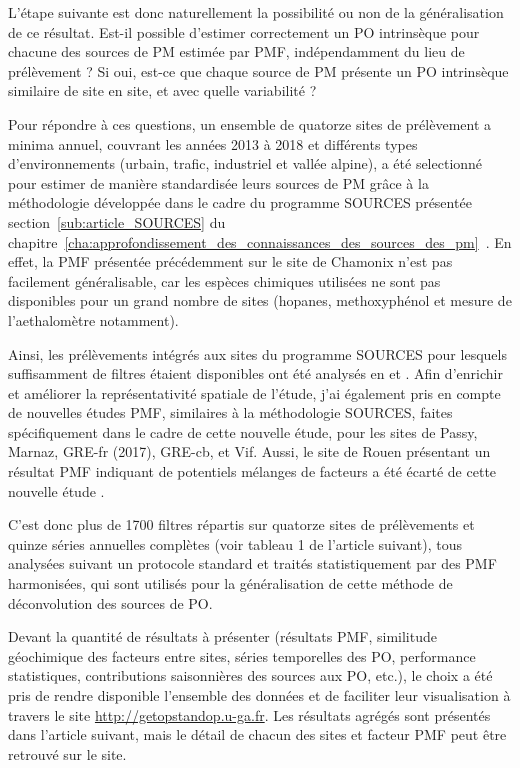 L'étape suivante est donc naturellement la possibilité ou non de la généralisation de ce
résultat.  Est-il possible d'estimer correctement un PO intrinsèque pour chacune des
sources de PM estimée par PMF, indépendamment du lieu de prélèvement ? Si oui, est-ce que
chaque source de PM présente un PO intrinsèque similaire de site en site, et avec quelle
variabilité ?

Pour répondre à ces questions, un ensemble de quatorze sites de prélèvement a minima annuel,
couvrant les années 2013 à 2018 et différents types d'environnements (urbain, trafic,
industriel et vallée alpine),
a été selectionné pour estimer de manière standardisée leurs sources de PM grâce à la
méthodologie développée dans le cadre du programme SOURCES présentée
section~\ref{sub:article_SOURCES} du
chapitre~\ref{cha:approfondissement_des_connaissances_des_sources_des_pm}~\autocite{weberSources2019}.
En effet, la PMF présentée précédemment sur le site de
Chamonix n'est pas facilement généralisable, car les espèces chimiques utilisées ne sont
pas disponibles pour un grand nombre de sites (hopanes, methoxyphénol et mesure de
l'aethalomètre notamment).

Ainsi, les prélèvements intégrés aux sites du programme SOURCES pour lesquels suffisamment de filtres étaient
disponibles ont été analysés en \POAA{} et \PODTT. Afin d'enrichir et améliorer la
représentativité spatiale de l'étude, j'ai également pris en compte de nouvelles études
PMF, similaires à la méthodologie SOURCES, faites spécifiquement dans le cadre de cette
nouvelle étude, pour les sites de Passy, Marnaz, GRE-fr (2017), GRE-cb, et Vif.
Aussi, le site de Rouen présentant un résultat PMF indiquant de potentiels mélanges de
facteurs a été écarté de cette nouvelle étude \autocite{weberComparison2019}.

C'est donc plus de 1700 filtres répartis sur quatorze sites de prélèvements et quinze séries
annuelles complètes (voir tableau 1 de l'article suivant), tous analysées suivant
un protocole standard et traités statistiquement par des PMF
harmonisées, qui sont utilisés pour la généralisation de cette méthode de déconvolution des
sources de PO.

\begin{tcolorbox}[colback=red!5!white,colframe=Melon,title=Note]
    Devant la quantité de résultats à présenter (résultats PMF, similitude géochimique des
    facteurs entre sites, séries temporelles des PO, performance statistiques,
    contributions saisonnières des sources aux PO, etc.), le choix a été pris de rendre
    disponible l'ensemble des données et de faciliter leur visualisation à travers le site
    \url{http://getopstandop.u-ga.fr}.
    Les résultats agrégés sont présentés dans l'article suivant, mais le détail de chacun
    des sites et facteur PMF peut être retrouvé sur le site.
\end{tcolorbox}


